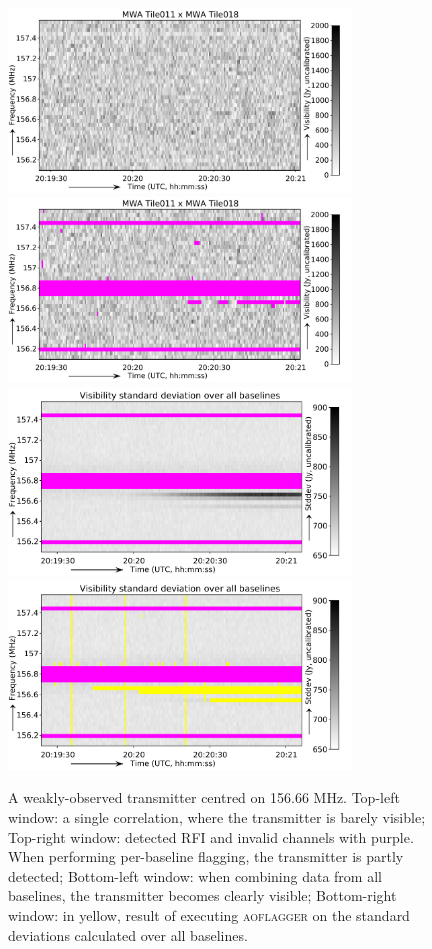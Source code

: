 \documentclass{pasa}
\begin{document}
\noindent\begin{figure}%
\begin{center}
\includegraphics[width=9.1cm]{img/156_7_mhz_example}\includegraphics[width=9.1cm]{img/156_7_mhz_flagged}\\
\includegraphics[width=9.1cm]{img/156_7_mhz_stddev}\includegraphics[width=9.1cm]{img/156_7_mhz_stddev_flagged}
\caption{A weakly-observed transmitter centred on 156.66 MHz. Top-left window: a single correlation, where the transmitter is barely visible; Top-right window: detected RFI and invalid channels with purple. When performing per-baseline flagging, the transmitter is partly detected; Bottom-left window: when combining data from all baselines, the transmitter becomes clearly visible; Bottom-right window: in yellow, result of executing \textsc{aoflagger} on the standard deviations calculated over all baselines.}\label{fig:156_7}
\end{center}
\end{figure}
\end{document}
